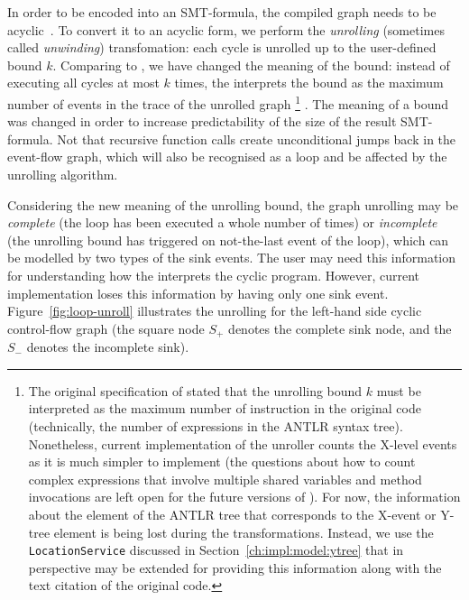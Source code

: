In order to be encoded into an SMT-formula, the compiled graph needs to be acyclic~\cite{Porthos17b}.
To convert it to an acyclic form, we perform the \textit{unrolling} (sometimes called \textit{unwinding}) transfomation: each cycle is unrolled up to the user-defined bound $k$.
Comparing to \porthos[1], we have changed the meaning of the bound: instead of executing all cycles at most $k$ times, the \porthos[2] interprets the bound as the maximum number of events in the trace of the unrolled graph%
%
\footnote{The original specification of \porthos[2] stated that the unrolling bound $k$ must be interpreted as the maximum number of instruction in the original code (technically, the number of expressions in the ANTLR syntax tree).
Nonetheless, current implementation of the \xgraph{} unroller counts the X-level events as it is much simpler to implement (the questions about how to count complex expressions that involve multiple shared variables and method invocations are left open for the future versions of \porthos[2]).
For now, the information about the element of the ANTLR tree that corresponds to the X-event or Y-tree element is being lost during the transformations.
Instead, we use the \texttt{LocationService} discussed in Section~\ref{ch:impl:model:ytree} that in perspective may be extended for providing this information along with the text citation of the original code.}
%
.
The meaning of a bound was changed in order to increase predictability of the size of the result SMT-formula.
Not that recursive function calls create unconditional jumps back in the event-flow graph, which will also be recognised as a loop and be affected by the unrolling algorithm.

Considering the new meaning of the unrolling bound, the graph unrolling may be \textit{complete} (the loop has been executed a whole number of times) or \textit{incomplete} (the unrolling bound has triggered on not-the-last event of the loop), which can be modelled by two types of the sink events.
The user may need this information for understanding how the \porthos[2] interprets the cyclic program.
However, current implementation loses this information by having only one sink event.
Figure~\ref{fig:loop-unroll} illustrates the unrolling for the left-hand side cyclic control-flow graph (the square node $S_{+}$ denotes the complete sink node, and the $S_{-}$ denotes the incomplete sink).

